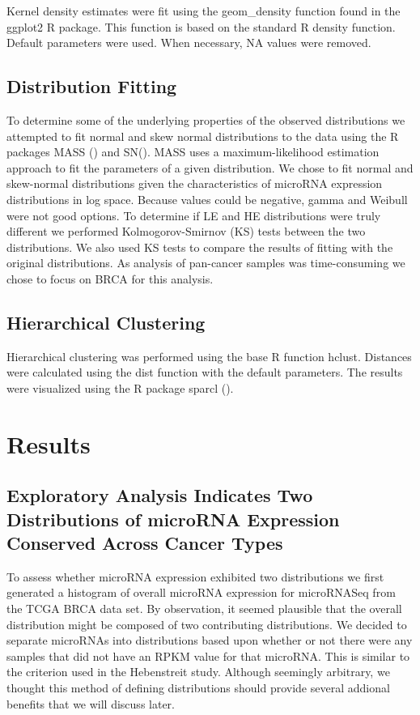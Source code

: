 \documentclass[12pt]{report}
\begin{document}
Kernel density estimates were fit using the geom\_density function found in the ggplot2 R package. This function is based on the standard R density function.
Default parameters were used. When necessary, NA values were removed.

\subsection*{Distribution Fitting}
 To determine some of the underlying properties of the observed distributions we attempted to fit normal and skew normal distributions to the data using the R packages MASS () and SN(). MASS uses
 a maximum-likelihood estimation approach to fit the parameters of a given distribution. We chose to fit normal and skew-normal distributions given the characteristics of
 microRNA expression distributions in log space. Because values could be negative, gamma and Weibull were not good options. To determine if LE and HE distributions were truly different we performed
 Kolmogorov-Smirnov (KS) tests between the two distributions. We also used KS tests to compare the results of fitting with the original distributions. As analysis of pan-cancer samples was time-consuming
 we chose to focus on BRCA for this analysis.

\subsection*{Hierarchical Clustering}
Hierarchical clustering was performed using the base R function hclust. Distances were calculated using the dist function with the default parameters. The results were visualized using
the R package sparcl ().

\section*{Results}
\subsection*{Exploratory Analysis Indicates Two Distributions of microRNA Expression Conserved Across Cancer Types}
To assess whether microRNA expression exhibited two distributions we first generated a histogram of overall microRNA expression
for microRNASeq from the TCGA BRCA data set. By observation, it seemed plausible that the overall distribution might be composed of two contributing distributions.
We decided to separate microRNAs into distributions based upon whether or not there were any samples that did not have an RPKM value for that microRNA.
This is similar to the criterion used in the Hebenstreit study. Although seemingly arbitrary, we thought this method of defining distributions should
provide several addional benefits that we will discuss later. %
\end{document}

